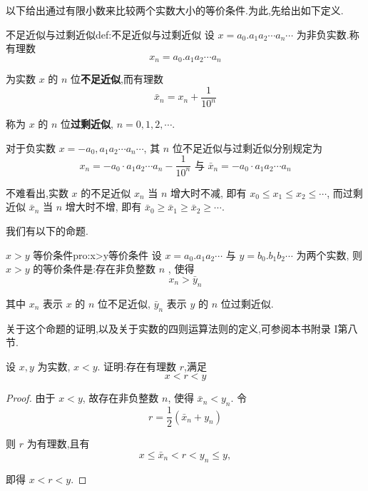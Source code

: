 以下给出通过有限小数来比较两个实数大小的等价条件.为此,先给出如下定义.

\begin{definition}{不足近似与过剩近似}{def:不足近似与过剩近似}
	设 $x=a_{0} . a_{1} a_{2} \cdots a_{n} \cdots$ 为非负实数.称有理数
	\[
	x_{n}=a_{0} . a_{1} a_{2} \cdots a_{n}
	\]

	为实数 $x$ 的 $n$ 位\textbf{不足近似},而有理数
	\[
	\bar{x}_{n}=x_{n}+\frac{1}{10^{n}}
	\]

	称为 $x$ 的 $n$ 位\textbf{过剩近似}, $n=0,1,2, \cdots$.

	对于负实数 $x=-a_{0}, a_{1} a_{2} \cdots a_{n} \cdots$, 其 $n$ 位不足近似与过剩近似分别规定为
	\[
	x_{n}=-a_{0} \cdot a_{1} a_{2} \cdots a_{n}-\frac{1}{10^{n}} \text { 与 } \bar{x}_{n}=-a_{0} \cdot a_{1} a_{2} \cdots a_{n}
	\]
\end{definition}

\begin{remark}
	不难看出,实数 $x$ 的不足近似 $x_{n}$ 当 $n$ 增大时不减, 即有 $x_{0} \leqslant x_{1} \leqslant x_{2} \leqslant \cdots$, 而过剩近似 $\bar{x}_{n}$ 当 $n$ 增大时不增, 即有 $\bar{x}_{0} \geqslant \bar{x}_{1} \geqslant \bar{x}_{2} \geqslant \cdots$.
\end{remark}


我们有以下的命题.

\begin{proposition}{$x>y$ 等价条件}{pro:x>y等价条件}
	设 $x=a_{0} . a_{1} a_{2} \cdots$ 与 $y=b_{0} . b_{1} b_{2} \cdots$ 为两个实数, 则 $x>y$ 的等价条件是:存在非负整数 $n$ , 使得
	\[
	x_{n}>\bar{y}_{n}
	\]

	其中 $x_{n}$ 表示 $x$ 的 $n$ 位不足近似, $\bar{y}_{n}$ 表示 $y$ 的 $n$ 位过剩近似.
\end{proposition}


关于这个命题的证明,以及关于实数的四则运算法则的定义,可参阅本书附录 $\mathrm{I}$第八节.

\begin{example}
	设 $x, y$ 为实数, $x<y$. 证明:存在有理数 $r$,满足
	\[
	x<r<y
	\]
\end{example}

\begin{proof}
	由于 $x<y$, 故存在非负整数 $n$, 使得 $\bar{x}_{n}<y_{n}$. 令
	\[
	r=\frac{1}{2}\left(\bar{x}_{n}+y_{n}\right)
	\]

	则 $r$ 为有理数,且有
	\[
	x \leqslant \bar{x}_{n}<r<y_{n} \leqslant y,
	\]

	即得 $x<r<y$.
\end{proof}


